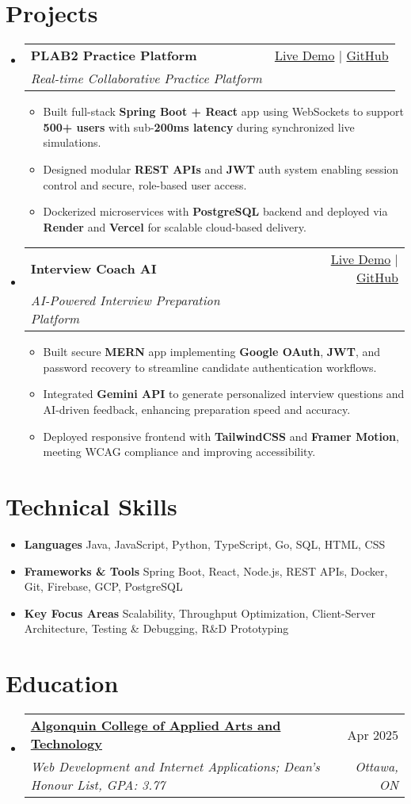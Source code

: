 \documentclass[letterpaper,11pt]{article}
\makeatletter
\newcommand{\resumeItem}[1]{\item\small{#1 \vspace{-2pt}}}
\newcommand{\resumeSubheading}[4]{
  \vspace{-1pt}\item
    \begin{tabular*}{0.97\textwidth}[t]{l@{\extracolsep{\fill}}r}
      \textbf{#1} & #2 \\
      \textit{\small#3} & \textit{\small #4} \\
    \end{tabular*}\vspace{-5pt}
}
\newcommand{\resumeSubHeadingListStart}{\begin{itemize}[leftmargin=*]}
\newcommand{\resumeSubHeadingListEnd}{\end{itemize}}
\newcommand{\resumeItemListStart}{\begin{itemize}}
\newcommand{\resumeItemListEnd}{\end{itemize}\vspace{-5pt}}
\makeatother
\begin{document}
\section{Projects}
  \resumeSubHeadingListStart
    \resumeSubheading
      {\textbf{PLAB2 Practice Platform}}{\href{https://plab2practice.com}{Live Demo} | \href{https://github.com/altansaid/plab2projectnew}{GitHub}}
      {Real-time Collaborative Practice Platform}{}
      \resumeItemListStart
        \resumeItem{Built full-stack \textbf{Spring Boot + React} app using WebSockets to support \textbf{500+ users} with sub-\textbf{200ms latency} during synchronized live simulations.}
        \resumeItem{Designed modular \textbf{REST APIs} and \textbf{JWT} auth system enabling session control and secure, role-based user access.}
        \resumeItem{Dockerized microservices with \textbf{PostgreSQL} backend and deployed via \textbf{Render} and \textbf{Vercel} for scalable cloud-based delivery.}
      \resumeItemListEnd

    \resumeSubheading
      {\textbf{Interview Coach AI}}{\href{https://interviewcoach-ai.vercel.app/}{Live Demo} | \href{https://github.com/altansaid/interviewcoach-ai}{GitHub}}
      {AI-Powered Interview Preparation Platform}{}
      \resumeItemListStart
        \resumeItem{Built secure \textbf{MERN} app implementing \textbf{Google OAuth}, \textbf{JWT}, and password recovery to streamline candidate authentication workflows.}
        \resumeItem{Integrated \textbf{Gemini API} to generate personalized interview questions and AI-driven feedback, enhancing preparation speed and accuracy.}
        \resumeItem{Deployed responsive frontend with \textbf{TailwindCSS} and \textbf{Framer Motion}, meeting WCAG compliance and improving accessibility.}
      \resumeItemListEnd
  \resumeSubHeadingListEnd

\section{Technical Skills}
  \resumeItemListStart
    \resumeItem{\textbf{Languages}}{Java, JavaScript, Python, TypeScript, Go, SQL, HTML, CSS}
    \resumeItem{\textbf{Frameworks \& Tools}}{Spring Boot, React, Node.js, REST APIs, Docker, Git, Firebase, GCP, PostgreSQL}
    \resumeItem{\textbf{Key Focus Areas}}{Scalability, Throughput Optimization, Client-Server Architecture, Testing \& Debugging, R\&D Prototyping}
  \resumeItemListEnd

\section{Education}
  \resumeSubHeadingListStart
    \resumeSubheading
      {\href{https://www.algonquincollege.com/sat/program/web-development-internet-applications/}{Algonquin College of Applied Arts and Technology}}{Apr 2025}
      {Web Development and Internet Applications; Dean's Honour List, GPA: 3.77}{Ottawa, ON}
  \resumeSubHeadingListEnd
\end{document}
